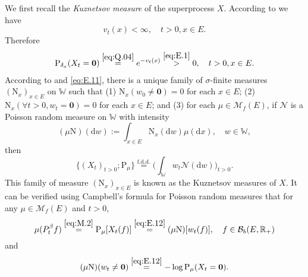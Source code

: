 \documentclass[12pt,a4paper]{amsart}
\numberwithin{equation}{section}
\theoremstyle{plain}
\theoremstyle{definition}
\theoremstyle{remark}
\begin{document}
	We first recall the \emph{Kuznetsov  measure} of the superprocess $X$.
	According to \cite[Proposition 1.3]{LiuRenSongSun2020} we have
\begin{equation} \label{eq:E.1}
	v_t(x)<\infty, \quad t>0, x\in E.
\end{equation}
	Therefore
\begin{align} \label{eq:E.11}
	\mathrm P_{\delta_x}(X_t = \mathbf 0) \overset{\eqref{eq:Q.04}}= e^{-v_t(x)}\overset{\eqref{eq:E.1}} > 0, \quad t>0, x\in E.
\end{align}
	According to \cite[Section 8.4]{Li2011Measure-valued} and \eqref{eq:E.11}, there is a unique family of $\sigma$-finite measures
	$(\mathrm N_x)_{x\in E}$
	on $\mathbb W$ such that
	(1) $\mathrm N_x(w_0 \neq \mathbf 0) = 0$ for each $x\in E$;
	(2) $\mathrm N_x (\forall t > 0, w_t =\mathbf 0) =0$ for each $x\in E$;
	and (3) for each $\mu \in \mathcal M_f(E)$, if $\mathcal N$ is a Poisson random measure on $\mathbb W$ with intensity
	\[
	(\mu\mathrm N)(\mathrm dw):= 
	\int_{x\in E} \mathrm N_x(\mathrm dw)\mu(\mathrm dx), \quad w\in \mathbb W,
	\]
	then
	\begin{equation} \label{eq:E.12}
	\{(X_t)_{t> 0};\mathrm P_\mu\}
	\overset{\text{f.d.d.}}= \Big(\int_{\mathbb W} w_t\mathcal N(\mathrm dw)\Big)_{t> 0}.
	\end{equation}
	This family of measure $(\mathrm N_x)_{x\in E}$ is known as the Kuznetsov measures of $X$.
	It can be verified using Campbell's formula for Poisson random measures that for any $\mu\in \mathcal M_f(E)$ and $t>0$,
\begin{equation} \label{eq:E.13}
	\mu(P_t^\beta f)
	\overset{\eqref{eq:M.2}}= \mathrm P_\mu[X_t(f)]
	\overset{\eqref{eq:E.12}}=(\mu \mathrm N) [w_t(f)],
	\quad f\in \mathcal B_b(E, \mathbb R_+)
\end{equation}
	and
\begin{equation} \label{eq:E.14}
	(\mu\mathrm N) (w_t\neq \mathbf 0)
	\overset{\eqref{eq:E.12}} = - \log \mathrm P_{\mu}(X_t = \mathbf 0).
\end{equation}
\end{document}
